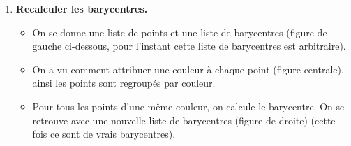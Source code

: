 \documentclass[10pt,class=report,crop=false]{standalone}
\begin{document}
\begin{activite}[Barycentres]
\begin{enumerate}
\begin{enumerate}
	\end{enumerate}

	\item \textbf{Recalculer les barycentres.}
	
	\begin{itemize}
	    \item On se donne une liste de points et une liste de barycentres (figure de gauche ci-dessous, pour l'instant cette liste de \og{}barycentres\fg{} est arbitraire).
     	\item On a vu comment attribuer une couleur à chaque point (figure centrale), ainsi les points sont regroupés par couleur. 
     	\item Pour tous les points d'une même couleur, on calcule le barycentre. On se retrouve avec une nouvelle liste de barycentres (figure de droite) (cette fois ce sont de \og{}vrais\fg{} barycentres).
     \end{itemize}
 

\end{enumerate}
\end{activite}
\end{document}
